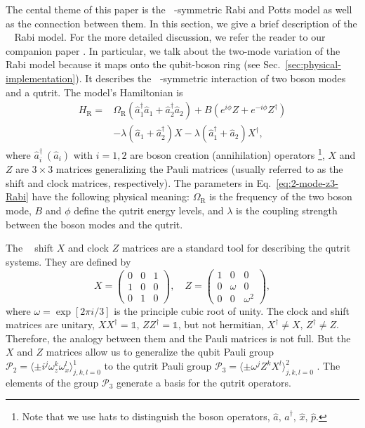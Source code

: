 \documentclass[reprint, aps, prx, amsmath, amssymb, longbibliography, superscriptaddress]{revtex4-2}
\DeclareMathOperator{\Zthree}{\mathbb{Z}_3}
\begin{document}
The cental theme of this paper is the $\Zthree$-symmetric Rabi and Potts model as well as the connection between them. In this section, we give a brief description of the $\Zthree$ Rabi model. For the more detailed discussion, we refer the reader to our companion paper \cite{lotkov_cat_}. In particular, we talk about the two-mode variation of the $\Zthree$ Rabi model because it maps onto the qubit-boson ring (see Sec.~\ref{sec:physical-implementation}). It describes the $\Zthree$-symmetric interaction of two boson modes and a qutrit. The model's Hamiltonian is
\begin{equation}
\label{eq:2-mode-z3-Rabi}
\begin{aligned}
     H_{\text{R}} = &\Omega_{\text{R}} (\hat a_1^{\dagger} \hat a_1 + \hat a_2^{\dagger} \hat a_2) + B (e^{i\phi} Z + e^{-i\phi} Z^{\dagger}) \\
    &- \lambda (\hat a_1 + \hat a_2^{\dagger}) X - \lambda (\hat a_1^{\dagger} + \hat a_2) X^{\dagger},
\end{aligned}
\end{equation}
where $\hat a_i^{\dagger}\  (\hat a_i)$ with $i = 1,2$ are boson creation (annihilation) operators \footnote{Note that we use hats to distinguish the boson operators, $\hat a,\, \hat a^{\dagger},\, \hat x, \,\hat p$.}, $X$ and $Z$ are $3\times 3 $ matrices generalizing the Pauli matrices (usually referred to as the shift and clock matrices, respectively). The parameters in Eq.~\eqref{eq:2-mode-z3-Rabi} have the following physical meaning: $\Omega_{\text{R}}$ is the frequency of the two boson mode, $B$ and $\phi$ define the qutrit energy levels, and $\lambda$ is the coupling strength between the boson modes and the qutrit.

The $\Zthree$ shift $X$ and clock $Z$ matrices are a standard tool for describing the qutrit systems.  They are defined by
\begin{equation}
\label{shift-clock-matreces}
    X = \begin{pmatrix} 
         0 & 0 & 1 \\
         1 & 0 & 0 \\
         0 & 1 & 0 
        \end{pmatrix}, \quad
    Z = \begin{pmatrix}
         1 & 0 & 0 \\
         0 & \omega & 0 \\
         0 & 0 & \omega^2
        \end{pmatrix},
      \end{equation}
where $\omega = \exp[2\pi i/3]$ is the principle cubic root of unity. The clock and shift matrices are unitary, $ X X^{\dagger} = \mathbb{1}, \, Z Z^{\dagger} = \mathbb{1}$, but not hermitian, $ X^{\dagger} \neq X, \, Z^{\dagger} \neq Z$. Therefore, the analogy between them and the Pauli matrices is not full. But the $X$ and $Z$ matrices allow us to generalize the qubit Pauli group $\mathcal{P}_2 = \langle \pm i^j \omega_z^k \omega_x^l\rangle_{j,k,l = 0}^1$ to the qutrit Pauli group $\mathcal{P}_3 = \langle \pm \omega^j Z^k X^l\rangle_{j,k,l= 0}^{2}$ . The elements of the group $\mathcal{P}_3$ generate a basis for the qutrit operators.
\end{document}
